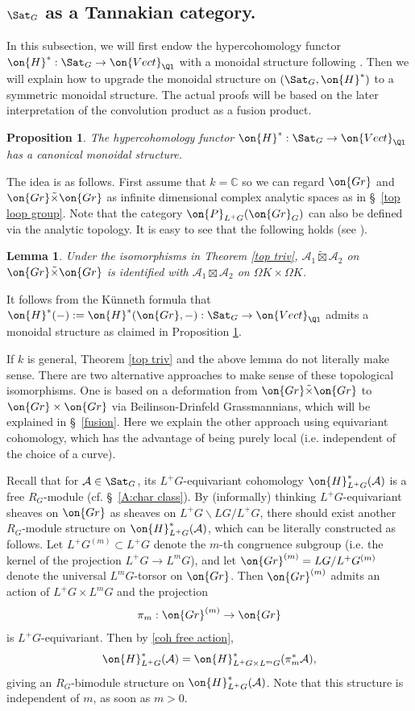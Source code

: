 \documentclass[]{pcmi}
\theoremstyle{plain}
\newtheorem{prop}[equation]{Proposition}
\newtheorem{lem}[equation]{Lemma}
\theoremstyle{remark}
\theoremstyle{definition}
\newcommand{\bC}{{\mathbb C}}
\newcommand{\mA}{{\mathcal A}}
\newcommand{\Gr}{{\on{Gr}}}
\begin{document}
\subsection{$\Sat_G$ as a Tannakian category.}\label{mon str of H}
In this subsection, we will first endow the hypercohomology functor $\on{H}^*: \Sat_G\to \on{Vect}_{\Ql}$ with a monoidal structure following \cite[\S\ 2.3]{Z14}. Then we will explain how to upgrade the monoidal structure on $(\Sat_G,\on{H}^*)$ to a symmetric monoidal structure. The actual proofs will be based on the later interpretation of the convolution product as a fusion product.


\begin{prop}\label{fiber functor}
The hypercohomology functor $\on{H}^*:\Sat_G\to \on{Vect}_{\Ql}$ has a canonical monoidal structure.
\end{prop}

The idea is as follows. First assume that $k=\bC$ so we can regard $\Gr$ and $\Gr\tilde\times\Gr$ as infinite dimensional complex analytic spaces as in \S~\ref{top loop group}. Note that the category $\on{P}_{L^+G}(\Gr_G)$ can also be defined via the analytic topology. It is easy to see that the following holds (see \cite[Proposition 2.1.1]{Gi1}).
\begin{lem}
Under the isomorphisms in Theorem \ref{top triv}, $\mA_1\tilde\boxtimes\mA_2$ on $\Gr\tilde\times\Gr$ is identified with $\mA_1\boxtimes\mA_2$ on $\Omega K\times\Omega K$.
\end{lem}
It follows from the K\"unneth formula that $\on{H}^*(-):=\on{H}^*(\Gr,-):\Sat_G\to \on{Vect}_{\Ql}$ admits a monoidal structure as claimed in Proposition \ref{fiber functor}.

If $k$ is general, Theorem \ref{top triv} and the above lemma do not literally make sense. There are two alternative approaches to make sense of these topological isomorphisms. One is based on a deformation from $\Gr\tilde\times \Gr$ to $\Gr\times \Gr$ via Beilinson-Drinfeld Grassmannians, which will be explained in \S\ \ref{fusion}. Here we explain the other approach using equivariant cohomology, which has the advantage of being purely local (i.e. independent of the choice of a curve).
 

Recall that for $\mA\in\Sat_G$, its $L^+G$-equivariant cohomology $\on{H}^*_{L^+G}(\mA)$ is a free $R_{G}$-module (cf. \S~\ref{A:char class}). By (informally) thinking $L^+G$-equivariant sheaves on $\Gr$ as sheaves on $L^+G\backslash LG/L^+G$,  there should exist another $R_{G}$-module structure on $\on{H}^*_{L^+G}(\mA)$, which can be literally constructed as follows. Let $L^+G^{(m)}\subset L^+G$ denote the $m$-th congruence subgroup (i.e. the kernel of the projection $L^+G\to L^mG$), and let $\Gr^{(m)}=LG/L^+G^{(m)}$ denote the universal $L^m G$-torsor on $\Gr$. Then $\Gr^{(m)}$ admits an action of $L^+G\times L^mG$ and the projection 
$$\pi_m:\Gr^{(m)}\to \Gr$$ is $L^+G$-equivariant. Then by \eqref{coh free action},
\[\on{H}^*_{L^+G}(\mA)= \on{H}^*_{L^+G\times L^mG}(\pi_m^*\mA),\] 
giving an $R_{G}$-bimodule structure on $\on{H}^*_{L^+G}(\mA)$. Note that this structure is independent of $m$, as soon as $m>0$. 
\end{document}
